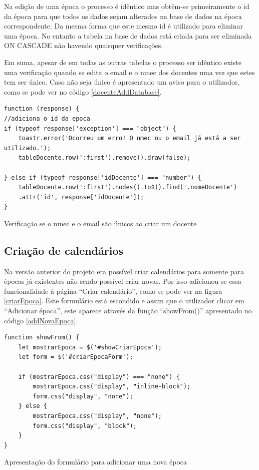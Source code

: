 \documentclass[12pt, twoside]{report}
\begin{document}
	Na edição de uma época o processo é idêntico mas obtêm-se primeiramente o id da época para que todos os dados sejam alterados na base de dados na época correspondente. Da mesma forma que este mesmo id é utilizado para eliminar uma época. No entanto a tabela na base de dados está criada para ser eliminada ON CASCADE não havendo quaisquer verificações.
	
	Em suma, apesar de em todas as outras tabelas o processo ser idêntico existe uma verificação quando se edita o email e o nmec dos docentes uma vez que estes tem ser único. Caso não seja único é apresentado um aviso para o utilizador, como se pode ver no código \ref{docenteAddDatabase}.
	
	\begin{listing}[H]
	\begin{verbatim}
function (response) {
//adiciona o id da epoca
if (typeof response['exception'] === "object") {
	toastr.error('Ocorreu um erro! O nmec ou o email já está a ser utilizado.');
	tableDocente.row(':first').remove().draw(false);
		
} else if (typeof response['idDocente'] === "number") {
	tableDocente.row(':first').nodes().to$().find('.nomeDocente')
	.attr('id', response['idDocente']);
}
	\end{verbatim}
	\caption{Verificação se o nmec e o email são únicos ao criar um docente}
	\label{docenteAddDatabase}
	\end{listing}

	\subsection{Criação de calendários}
	Na versão anterior do projeto era possível criar calendários para somente para épocas já existentes não sendo possível criar novas. Por isso adicionou-se essa funcionalidade à página ``Criar calendário'', como se pode ver na figura \ref{criarEpoca}. Este formulário está escondido e assim que o utilizador clicar em ``Adicionar época'', este aparece através da função ``showFrom()'' apresentado 
	no código \ref{addNovaEpoca}.
	
	\begin{listing}[H]
	\begin{verbatim}
function showFrom() {
	let mostrarEpoca = $('#showCriarEpoca');
	let form = $('#criarEpocaForm');
			
	if (mostrarEpoca.css("display") === "none") {
		mostrarEpoca.css("display", "inline-block");
		form.css("display", "none");
	} else {
		mostrarEpoca.css("display", "none");
		form.css("display", "block");
	}
}
	\end{verbatim}
	\caption{Apresentação do formulário para adicionar uma nova época}
	\label{addNovaEpoca}
	\end{listing}
	
\end{document}
